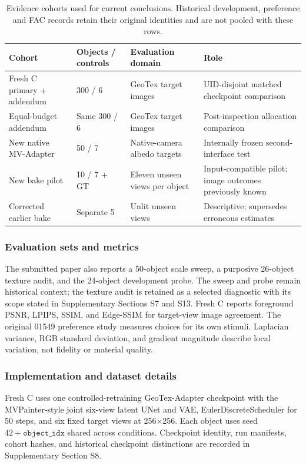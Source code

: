 \documentclass[times,twocolumn,final]{elsarticle}
\begin{document}
\begin{table}[t]\centering\scriptsize
\caption{Evidence cohorts used for current conclusions. Historical development, preference and FAC records retain their original identities and are not pooled with these rows.}
\label{tab:cohort-map}
\begin{tabular}{llll}
\toprule Cohort & Objects / controls & Evaluation domain & Role \\
\midrule
Fresh C primary + addendum & 300 / 6 & GeoTex target images & UID-disjoint matched checkpoint comparison \\
Equal-budget addendum & Same 300 / 6 & GeoTex target images & Post-inspection allocation comparison \\
New native MV-Adapter & 50 / 7 & Native-camera albedo targets & Internally frozen second-interface test \\
New bake pilot & 10 / 7 + GT & Eleven unseen views per object & Input-compatible pilot; image outcomes previously known \\
Corrected earlier bake & Separate 5 & Unlit unseen views & Descriptive; supersedes erroneous estimates \\
\bottomrule\end{tabular}
\end{table}

\subsubsection{Evaluation sets and metrics}

The submitted paper also reports a 50-object scale sweep, a purposive 26-object texture audit, and the 24-object development probe. The sweep and probe remain historical context; the texture audit is retained as a selected diagnostic with its scope stated in Supplementary Sections S7 and S13. Fresh C reports foreground PSNR, LPIPS, SSIM, and Edge-SSIM for target-view image agreement. The original 01549 preference study measures choices for its own stimuli. Laplacian variance, RGB standard deviation, and gradient magnitude describe local variation, not fidelity or material quality.

\subsubsection{Implementation and dataset details}

Fresh C uses one controlled-retraining GeoTex-Adapter checkpoint with the MVPainter-style joint six-view latent UNet and VAE, EulerDiscreteScheduler for 50 steps, and six fixed target views at 256$\times$256. Each object uses seed $42+\texttt{object\_idx}$ shared across conditions. Checkpoint identity, run manifests, cohort hashes, and historical checkpoint distinctions are recorded in Supplementary Section S8.
\end{document}
